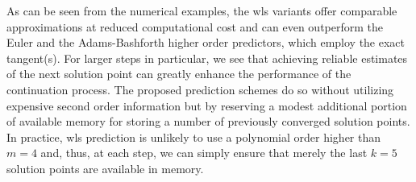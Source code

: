 As can be seen from the numerical examples, the \acrshort{wls} 
variants offer comparable approximations at reduced computational cost and can 
even outperform the Euler and the 
Adams-Bashforth higher order predictors, which employ the exact tangent(s). For 
larger steps in 
particular, we see that achieving reliable estimates of the next solution point 
can greatly enhance the performance of the continuation process. The proposed 
prediction schemes do so without utilizing expensive second order information 
but by reserving a modest additional portion of available memory for 
storing a number of previously converged solution points. In practice, 
\acrshort{wls} prediction is unlikely to use a polynomial order higher than 
$m=4$ and, thus, at each step, we can simply ensure that merely the last $k=5$ 
solution points are available in memory. 




